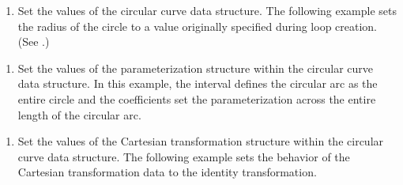 \documentclass[letterpaper,12pt,english,openany,oneside]{sphinxmanual}
\begin{document}
\begin{sphinxVerbatim}[commandchars=\\\{\}]
 
\end{sphinxVerbatim}
\begin{enumerate}
%
\setcounter{enumi}{2}
\item {} 
Set the values of the circular curve data structure. The following example sets the radius of the circle to a value originally specified during loop creation. (See .)

\end{enumerate}

\begin{sphinxVerbatim}[commandchars=\\\{\}]
  
\end{sphinxVerbatim}
\begin{enumerate}
%
\setcounter{enumi}{3}
\item {} 
Set the values of the parameterization structure within the circular curve data structure. In this example, the interval defines the circular arc as the entire circle and the co\sphinxhyphen{}efficients set the parameterization across the entire length of the circular arc.

\end{enumerate}

\begin{sphinxVerbatim}[commandchars=\\\{\}]
  
  
  
  
\end{sphinxVerbatim}
\begin{enumerate}
%
\setcounter{enumi}{4}
\item {} 
Set the values of the Cartesian transformation structure within the circular curve data structure. The following example sets the behavior of the Cartesian transformation data to the identity transformation.

\end{enumerate}
\end{document}
